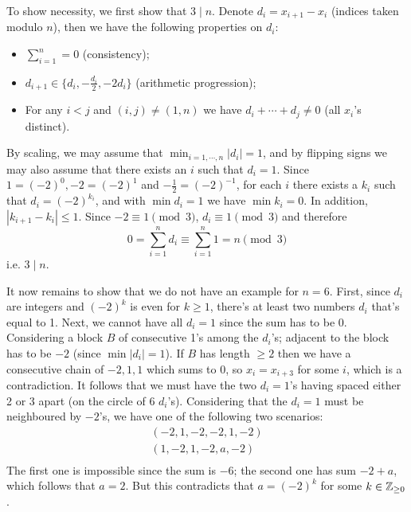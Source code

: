 \documentclass[11pt,a4paper]{article}
\begin{document}
\begin{enumerate}
		To show necessity, we first show that $3\mid n$. 
		Denote $d_i = x_{i+1}-x_i$ (indices taken modulo $n$), then we have the following properties on $d_i$: 
		\begin{itemize}
			\item $\sum_{i=1}^n = 0$ (consistency); 
			
			\item $d_{i + 1}\in \{d_i, -\frac{d_i}{2}, -2d_i\}$ (arithmetic progression); 
			
			\item For any $i < j$ and $(i, j)\neq (1, n)$ we have $d_i + \cdots + d_j\neq 0$ (all $x_i$'s distinct). 
		\end{itemize}
	    
	    By scaling, we may assume that $\min_{i=1, \cdots, n} |d_i| = 1$, 
	    and by flipping signs we may also assume that there exists an $i$ such that $d_i=1$. 
	    Since $1 = (-2)^0, -2=(-2)^1$ and $-\frac 12=(-2)^{-1}$, for each $i$ there exists a $k_i$ such that 
	    $d_i = (-2)^{k_i}$, 
	    and with $\min d_i=1$ we have $\min k_i=0$. 
	    In addition, $|k_{i+1} - k_i|\le 1$. 
	    Since $-2\equiv 1\pmod{3}$, $d_i\equiv 1\pmod{3}$ and therefore 
	    \begin{equation}
	    	0 = \sum_{i=1}^n d_i \equiv \sum_{i=1}^n 1 = n\pmod{3}
	    \end{equation}
        i.e. $3\mid n$. 
        
        It now remains to show that we do not have an example for $n=6$. 
        First, since $d_i$ are integers and $(-2)^k$ is even for $k\ge 1$, 
        there's at least two numbers $d_i$ that's equal to 1. 
        Next, we cannot have all $d_i=1$ since the sum has to be 0. 
        Considering a block $B$ of consecutive 1's among the $d_i$'s; 
        adjacent to the block has to be $-2$ (since $\min |d_i|=1$). 
        If $B$ has length $\ge 2$ then we have a consecutive chain of $-2, 1, 1$ which sums to 0, 
        so $x_i=x_{i+3}$ for some $i$, which is a contradiction. 
        It follows that we must have the two $d_i=1$'s having spaced either 2 or 3 apart (on the circle of 6 $d_i$'s). 
        Considering that the $d_i=1$ must be neighboured by $-2$'s, we have one of the following two scenarios: 
        \begin{align}
        	  (-2, 1, -2, -2, 1, -2)\\
        	  (1, -2, 1, -2, a, -2)\\
        \end{align}
        The first one is impossible since the sum is $-6$; 
        the second one has sum $-2+a$, which follows that $a=2$. 
        But this contradicts that $a=(-2)^k$ for some $k\in{\mathbb Z}_{\ge 0}$. 
		
	\end{enumerate}
\end{document}
